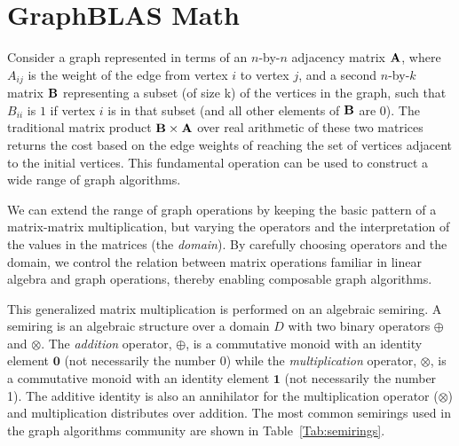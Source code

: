 \section{GraphBLAS Math}
\label{sec:math}

Consider a graph represented in terms of an $n$-by-$n$ adjacency matrix ${\bf A}$,
where $A_{ij}$ is the weight of the edge from vertex $i$ to vertex $j$,
and a second $n$-by-$k$ matrix ${\bf B}$ representing a subset (of size k) of the vertices
in the graph, such that $B_{ii}$ is $1$ if vertex $i$ is in that subset
(and all other elements of ${\bf B}$ are 0).  The traditional matrix
product ${\bf B} \times {\bf A}$ over real arithmetic of these two matrices returns the cost
based on the edge weights of reaching the set of vertices
adjacent to the initial vertices.  This fundamental operation can be
used to construct a wide range of graph algorithms.

We can extend the range of graph operations by keeping the basic
pattern of a matrix-matrix multiplication, but varying
the operators and the interpretation of the values in the matrices (the \emph{domain}).
By carefully choosing operators and the domain, we control the
relation between matrix operations familiar in linear algebra and graph operations, thereby enabling
composable graph algorithms.

This generalized matrix multiplication is performed on an algebraic semiring.   
A semiring is an algebraic
structure over a domain $D$ with two binary operators $\oplus$ and $\otimes$.
The \emph{addition} operator, $\oplus$, is a commutative monoid with an identity 
element $\mathbf{0}$ (not necessarily the number 0)
while the \emph{multiplication} operator, $\otimes$, is a commutative monoid with an 
identity element $\mathbf{1}$ (not necessarily the number 1).  The additive 
identity is also an annihilator for the multiplication 
operator ($\otimes$) and multiplication distributes over addition.  The most 
common semirings used in the graph algorithms community are 
shown in Table~\ref{Tab:semirings}.
  
